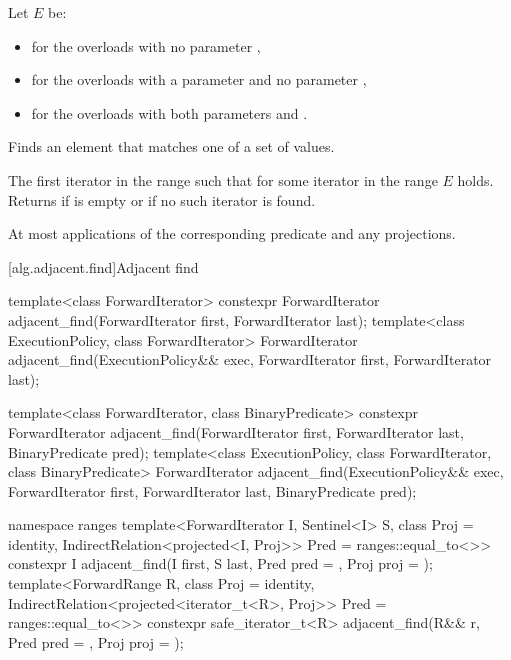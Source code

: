 \begin{itemdescr}
\pnum
Let $E$ be:
\begin{itemize}
\item {} for the overloads with no parameter ,
\item {} for the overloads with a parameter  and no parameter ,
\item {} for the overloads with both parameters  and .
\end{itemize}

\pnum
\effects
Finds an element that matches one of a set of values.

\pnum
\returns
The first iterator
in the range 
such that for some
iterator
in the range  $E$ holds.
Returns 
if  is empty or
if no such iterator is found.

\pnum
\complexity
At most
applications of the corresponding predicate and any projections.
\end{itemdescr}

[alg.adjacent.find]{Adjacent find}

%
\begin{itemdecl}
template<class ForwardIterator>
  constexpr ForwardIterator
    adjacent_find(ForwardIterator first, ForwardIterator last);
template<class ExecutionPolicy, class ForwardIterator>
  ForwardIterator
    adjacent_find(ExecutionPolicy&& exec,
                  ForwardIterator first, ForwardIterator last);

template<class ForwardIterator, class BinaryPredicate>
  constexpr ForwardIterator
    adjacent_find(ForwardIterator first, ForwardIterator last,
                  BinaryPredicate pred);
template<class ExecutionPolicy, class ForwardIterator, class BinaryPredicate>
  ForwardIterator
    adjacent_find(ExecutionPolicy&& exec,
                  ForwardIterator first, ForwardIterator last,
                  BinaryPredicate pred);

namespace ranges {
  template<ForwardIterator I, Sentinel<I> S, class Proj = identity,
      IndirectRelation<projected<I, Proj>> Pred = ranges::equal_to<>>
    constexpr I adjacent_find(I first, S last, Pred pred = {},
                              Proj proj = {});
  template<ForwardRange R, class Proj = identity,
      IndirectRelation<projected<iterator_t<R>, Proj>> Pred = ranges::equal_to<>>
    constexpr safe_iterator_t<R>
      adjacent_find(R&& r, Pred pred = {}, Proj proj = {});
}
\end{itemdecl}

